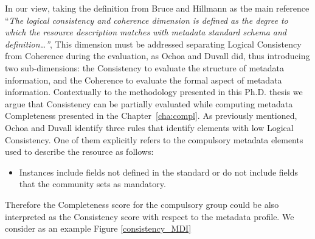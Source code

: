 \documentclass[epsfig,a4paper,12pt,titlepage]{book}
\begin{document}
In our view, taking the definition from Bruce and Hillmann as the main reference ``\textit{The logical consistency and coherence dimension is defined as the degree to which the resource description matches with metadata standard schema and definition\dots''}, This dimension must be addressed separating Logical Consistency from Coherence during the evaluation, as Ochoa and Duvall did, thus  introducing two sub-dimensions: the Consistency to evaluate the structure of metadata information, and the Coherence to evaluate the formal aspect of metadata information. Contextually to the methodology presented in this Ph.D. thesis we argue that Consistency can be partially evaluated while computing metadata Completeness presented in the Chapter~\ref{cha:compl}.  As previously mentioned, Ochoa and Duvall identify three rules that identify elements with low Logical Consistency. One of them explicitly refers to the compulsory metadata elements used to describe the resource as follows:

\begin{itemize}
    \item Instances include fields not defined in the standard or do not include fields that the community sets as mandatory. 
\end{itemize}

Therefore the Completeness score for the compulsory group could be also interpreted as the Consistency score with respect to the metadata profile. We consider as an example Figure \ref{consistency_MDI} %
\end{document}
